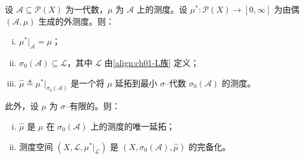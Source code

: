 \documentclass[../../main.tex]{subfiles}%
\begin{document}
\begin{theorem}\label{theorem:ch01-测度延拓}
设 $\mathcal{A}\subseteq\mathcal{P}(X)$ 为一代数，$\mu$ 为 $\mathcal{A}$ 上的测度。设 $\mu^*:\mathcal{P}(X)\to[0,\infty]$ 为由偶 $(\mathcal{A},\mu)$ 生成的外测度。则：
\begin{enumerate}[(i)]
\item $\mu^*|_{\mathcal{A}}=\mu$；
\item $\sigma_0(\mathcal{A})\subseteq\mathcal{L}$，其中 $\mathcal{L}$ 由\eqref{align:ch01-L族} 定义；
\item $\widehat{\mu}\triangleq \mu^*|_{\sigma_0(\mathcal{A})}$ 是一个将 $\mu$ 延拓到最小 $\sigma$--代数 $\sigma_0(\mathcal{A})$ 的测度。
\end{enumerate}
此外，设 $\mu$ 为 $\sigma$--有限的。则：
\begin{enumerate}[(iv)]
\item $\widehat{\mu}$ 是 $\mu$ 在 $\sigma_0(\mathcal{A})$ 上的测度的唯一延拓；
\item 测度空间 $(X,\mathcal{L},\mu^*|_{\mathcal{L}})$ 是 $(X,\sigma_0(\mathcal{A}),\widehat{\mu})$ 的完备化。
\end{enumerate}
\end{theorem}
\end{document}
